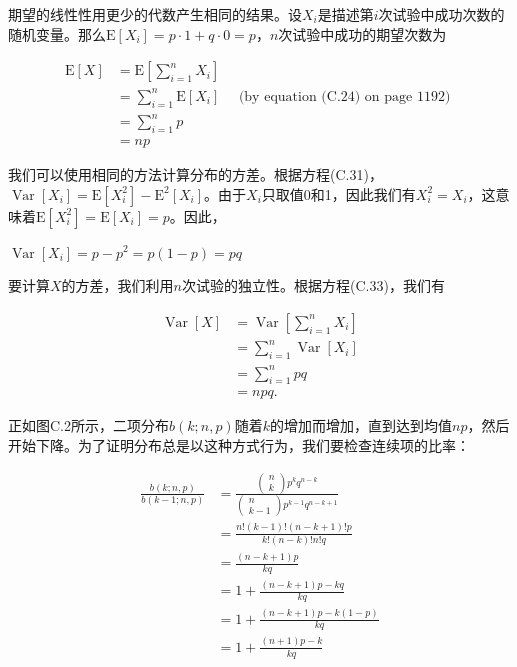 \documentclass[lang=cn,newtx,10pt,scheme=chinese]{elegantbook}
\begin{document}
期望的线性性用更少的代数产生相同的结果。设$X_i$是描述第$i$次试验中成功次数的随机变量。那么$\mathrm{E}\left[X_i\right]=p \cdot 1+q \cdot 0=p$，$n$次试验中成功的期望次数为

$$
\begin{aligned}
\mathrm{E}[X] & =\mathrm{E}\left[\sum_{i=1}^n X_i\right] \\
& =\sum_{i=1}^n \mathrm{E}\left[X_i\right] \quad \text { (by equation (C.24) on page 1192) } \\
& =\sum_{i=1}^n p \\
& =n p
\end{aligned}
$$

我们可以使用相同的方法计算分布的方差。根据方程(C.31)，$\operatorname{Var}\left[X_i\right]=\mathrm{E}\left[X_i^2\right]-\mathrm{E}^2\left[X_i\right]$。由于$X_i$只取值0和1，因此我们有$X_i^2=X_i$，这意味着$\mathrm{E}\left[X_i^2\right]=\mathrm{E}\left[X_i\right]=p$。因此，

$\operatorname{Var}\left[X_i\right]=p-p^2=p(1-p)=p q$

要计算$X$的方差，我们利用$n$次试验的独立性。根据方程(C.33)，我们有

$$
\begin{aligned}
\operatorname{Var}[X] & =\operatorname{Var}\left[\sum_{i=1}^n X_i\right] \\
& =\sum_{i=1}^n \operatorname{Var}\left[X_i\right] \\
& =\sum_{i=1}^n p q \\
& =n p q .
\end{aligned}
$$

正如图C.2所示，二项分布$b(k; n, p)$随着$k$的增加而增加，直到达到均值$n p$，然后开始下降。为了证明分布总是以这种方式行为，我们要检查连续项的比率：

$$
\begin{aligned}
\frac{b(k ; n, p)}{b(k-1 ; n, p)} & =\frac{\left(\begin{array}{c}
n \\
k
\end{array}\right) p^k q^{n-k}}{\left(\begin{array}{c}
n \\
k-1
\end{array}\right) p^{k-1} q^{n-k+1}} \\
& =\frac{n !(k-1) !(n-k+1) ! p}{k !(n-k) ! n ! q} \\
& =\frac{(n-k+1) p}{k q} \\
& =1+\frac{(n-k+1) p-k q}{k q} \\
& =1+\frac{(n-k+1) p-k(1-p)}{k q} \\
& =1+\frac{(n+1) p-k}{k q}
\end{aligned}
$$
\end{document}
